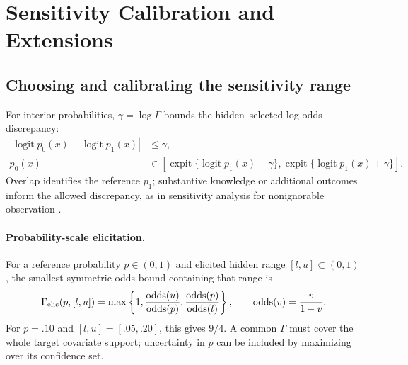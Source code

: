\section{Sensitivity Calibration and Extensions}
\label{app:e}\label{app:discussion}

\subsection{Choosing and calibrating the sensitivity range}
\label{app:gamma-calibration}

For interior probabilities, $\gamma=\log\Gamma$ bounds the hidden--selected log-odds discrepancy:
\begin{equation}
\begin{aligned}
|\operatorname{logit}p_0(x)-\operatorname{logit}p_1(x)|&\leq\gamma,\\
p_0(x)&\in[\operatorname{expit}\{\operatorname{logit}p_1(x)-\gamma\},
\operatorname{expit}\{\operatorname{logit}p_1(x)+\gamma\}].
\end{aligned}
\label{eq:e:log-odds-sensitivity}
\end{equation}
Overlap identifies the reference $p_1$; substantive knowledge or additional outcomes inform the allowed discrepancy, as in sensitivity analysis for nonignorable observation \citep{rosenbaum2002observational,scharfstein1999adjusting,tan2006distributional,zhao2019sensitivity}.

\paragraph{Probability-scale elicitation.}
For a reference probability $p\in(0,1)$ and elicited hidden range $[l,u]\subset(0,1)$, the smallest symmetric odds bound containing that range is
\begin{equation}
\Gamma_{\rm elic}(p,[l,u])=
\max\left\{1,\frac{\operatorname{odds}(u)}{\operatorname{odds}(p)},
\frac{\operatorname{odds}(p)}{\operatorname{odds}(l)}\right\},
\qquad\operatorname{odds}(v)=\frac{v}{1-v}.
\label{eq:e:elicited-gamma}
\end{equation}
For $p=.10$ and $[l,u]=[.05,.20]$, this gives $9/4$. A common $\Gamma$ must cover the whole target covariate support; uncertainty in $p$ can be included by maximizing over its confidence set.

